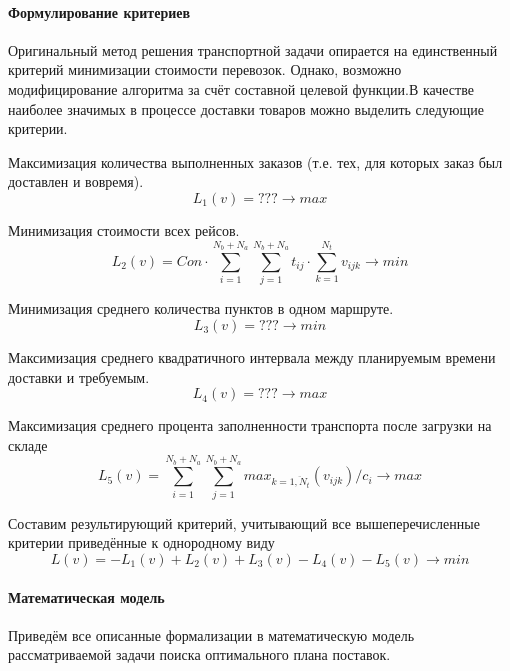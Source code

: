 	\paragraph{Формулирование критериев}   
	Оригинальный метод решения транспортной задачи опирается на единственный критерий минимизации стоимости перевозок. Однако, возможно модифицирование алгоритма за счёт составной целевой функции\cite{trans:polycrit}.В качестве наиболее значимых в процессе доставки товаров можно выделить следующие критерии.
	
	Максимизация количества выполненных заказов (т.е. тех, для которых заказ был доставлен и вовремя).
	\begin{equation}
		L_1(v) = ??? \to max
	\end{equation}
	
	Минимизация стоимости всех рейсов.
	\begin{equation}
		L_2(v) = Con \cdot \sum_{i=1}^{N_b+N_a} \sum_{j=1}^{N_b+N_a} t_{ij} \cdot \sum_{k=1}^{N_t} v_{ijk} \to min
	\end{equation}
	
	Минимизация среднего количества пунктов в одном маршруте.
	\begin{equation}
		L_3(v) = ??? \to min
	\end{equation}
	
	Максимизация среднего квадратичного интервала между планируемым времени доставки и требуемым.
	\begin{equation}
		L_4(v) = ??? \to max
	\end{equation}	
	
	Максимизация среднего процента заполненности транспорта после загрузки на складе
	\begin{equation}
		L_5(v) = \sum_{i=1}^{N_b+N_a} \sum_{j=1}^{N_b+N_a} max_{k = \overline{1, N_t}}(v_{ijk}) / c_i \to max
	\end{equation}		
	
	Составим результирующий критерий, учитывающий все вышеперечисленные критерии приведённые к однородному виду
	\begin{equation}
		L(v) = -L_1(v) + L_2(v) + L_3(v) - L_4(v) - L_5(v) \to min
	\end{equation}

	\paragraph{Математическая модель}
	Приведём все описанные формализации в математическую модель рассматриваемой задачи поиска оптимального плана поставок.
	
